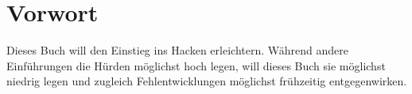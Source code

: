 
\chapter{Vorwort}

Dieses Buch will den Einstieg ins Hacken erleichtern. Während andere Einführungen die Hürden möglichst hoch legen, will dieses Buch sie möglichst niedrig legen und zugleich Fehlentwicklungen möglichst frühzeitig entgegenwirken.